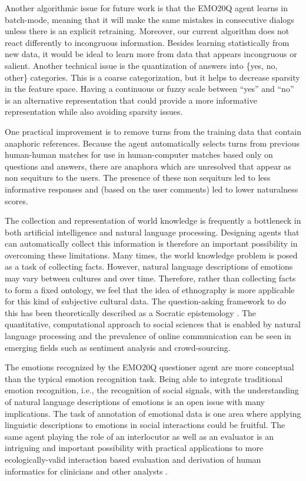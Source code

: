 \documentclass[a4paper]{article}
\begin{document}
Another algorithmic issue for future work is that the EMO20Q agent learns in
batch-mode, meaning that it will make the same mistakes in consecutive dialogs
unless there is an explicit retraining.  Moreover, our current algorithm does
not react differently to incongruous information.  Besides learning
statistically from new data, it would be ideal to learn more from data that
appears incongruous or salient. Another technical issue is the quantization of
answers into \{yes, no, other\} categories.  This is a coarse categorization,
but it helps to decrease sparsity in the feature space.  Having a continuous
or fuzzy scale between ``yes'' and ``no'' is an alternative representation
that could provide a more informative representation while also avoiding
sparsity issues.

One practical improvement is to remove turns from the training data that
contain anaphoric references.  Because the agent automatically selects turns
from previous human-human matches for use in human-computer matches based only
on questions and answers, there are anaphora which are unresolved that appear
as non sequiturs to the users.  The presence of these non sequiturs led to less
informative responses and (based on the user comments) led to lower
naturalness scores.

The collection and representation of world knowledge is frequently a
bottleneck in both artificial intelligence and natural language processing.
Designing agents that can automatically collect this information is therefore
an important possibility in overcoming these limitations.  Many times, the
world knowledge problem is posed as a task of collecting facts.  However,
natural language descriptions of emotions may vary between cultures and over
time.  Therefore, rather than collecting facts to form a fixed ontology, we
feel that the idea of ethnography is more applicable for this kind of
subjective cultural data.  The question-asking framework to do this has been
theoretically described as a Socratic epistemology \cite{Hintikka2007}.  The
quantitative, computational approach to social sciences that is enabled by
natural language processing and the prevalence of online communication can be
seen in emerging fields such as sentiment analysis and crowd-sourcing.

The emotions recognized by the EMO20Q questioner agent are more conceptual
than the typical emotion recognition task.  Being able to integrate
traditional emotion recognition, i.e., the recognition of social signals, with
the understanding of natural language descriptions of emotions is an open issue
with many implications.  The task of annotation of emotional data is one area
where applying linguistic descriptions to emotions in social interactions
could be fruitful.  The same agent playing the role of an interlocutor as well
as an evaluator is an intriguing and important possibility with practical
applications to more ecologically-valid interaction based evaluation and
derivation of human informatics for clinicians and other analysts
\cite{Alderson-Day2011}.
\end{document}
